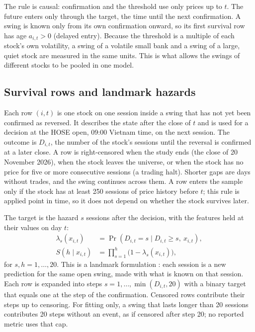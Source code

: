 The rule is causal: confirmation and the threshold use only prices up to $t$. The future enters
only through the target, the time until the next confirmation. A swing is known only from its own
confirmation onward, so its first survival row has age $a_{i,t}>0$ (delayed entry). Because the
threshold is a multiple of each stock's own volatility, a swing of a volatile small bank and a
swing of a large, quiet stock are measured in the same units. This is what allows the swings of
different stocks to be pooled in one model.

\subsection{Survival rows and landmark hazards}\label{sec:survival}

Each row $(i,t)$ is one stock on one session inside a swing that has not yet been confirmed as
reversed. It describes the state after the close of $t$ and is used for a decision at the HOSE
open, 09:00 Vietnam time, on the next session. The outcome is $D_{i,t}$, the number of the stock's
sessions until the reversal is confirmed at a later close. A row is right-censored when the study
ends (the close of 20 November 2026), when the stock leaves the universe, or when the stock has no price for
five or more consecutive sessions (a trading halt). Shorter gaps are days without trades, and the
swing continues across them. A row enters the sample only if the stock has at least 250 sessions of
price history before $t$; this rule is applied point in time, so it does not depend on whether the
stock survives later.

The target is the hazard $s$ sessions after the decision, with the features held at their values on
day $t$:
\begin{equation}\label{eq:hazard}
\begin{split}
  \lambda_s(x_{i,t}) &= \Pr\!\left(D_{i,t}=s \mid D_{i,t}\ge s,\ x_{i,t}\right),\\
  S(h\mid x_{i,t}) &= \prod_{s=1}^{h}\bigl(1-\lambda_s(x_{i,t})\bigr),
\end{split}
\end{equation}
for $s,h = 1,\dots,20$. This is a landmark formulation \citep{vanHouwelingen2007}: each session is
a new prediction for the same open swing, made with what is known on that session. Each row is
expanded into steps $s=1,\dots,\min(D_{i,t},20)$ with a binary target that equals one at the step
of the confirmation. Censored rows contribute their steps up to censoring. For fitting only,
a swing that lasts longer than 20 sessions contributes 20 steps without an event, as if censored
after step 20; no reported metric uses that cap.

